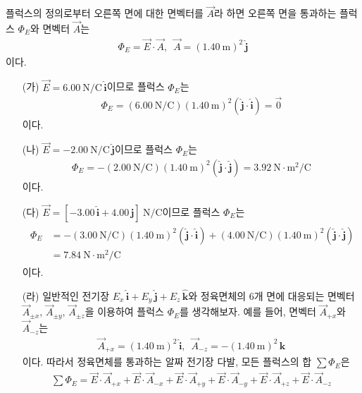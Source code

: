\documentclass[tightenlines,floatfix,nofootinbib,superscriptaddress,fleqn]{revtex4-2}
\begin{document}
플럭스의 정의로부터 오른쪽 면에 대한 면벡터를 $\vec{A}$라 하면 
오른쪽 면을 통과하는 플럭스 $\Phi_E$와 면벡터 $\vec{A}$는
\begin{align}
  \Phi_E = \vec{E}\cdot\vec{A},\,\,\,
  \vec{A}=(1.40~\mathrm{m})^2\,\hat{\bm{j}}
\end{align}
이다. 
\begin{itemize}
  \item[(가)]$\vec{E} =  6.00~\mathrm{N/C}\,\hat{\bm{i}}$이므로 플럭스 $\Phi_E$는
  \begin{align}
    \Phi_E =(6.00~\mathrm{N/C})(1.40~\mathrm{m})^2(\hat{\bm{j}}\cdot\hat{\bm{i}})
    =\vec{0}
  \end{align}
  이다.
  \item[(나)]$\vec{E} = -2.00~\mathrm{N/C}\,\hat{\bm{j}}$이므로 플럭스 $\Phi_E$는
  \begin{align}
    \Phi_E =-(2.00~\mathrm{N/C})(1.40~\mathrm{m})^2(\hat{\bm{j}}\cdot\hat{\bm{j}})
    =3.92~\mathrm{N\cdot m^2/C}
  \end{align}
  이다.
  \item[(다)]$\vec{E} = [-3.00\,\hat{\bm{i}}+4.00\,\hat{\bm{j}}]~\mathrm{N/C}$이므로 
  플럭스 $\Phi_E$는
  \begin{align}
    \begin{split}
      \Phi_E &=-(3.00~\mathrm{N/C})(1.40~\mathrm{m})^2(\hat{\bm{j}}\cdot\hat{\bm{i}})
      +(4.00~\mathrm{N/C})(1.40~\mathrm{m})^2(\hat{\bm{j}}\cdot\hat{\bm{j}})  \\
      &=7.84~\mathrm{N\cdot m^2/C}
    \end{split}
  \end{align}
  이다.
  \item[(라)] 일반적인 전기장 $E_x\,\hat{\bm{i}}+E_y\,\hat{\bm{j}}+E_z\,\hat{\bm{k}}$와
  정육면체의 6개 면에 대응되는 면벡터 $\vec{A}_{\pm x},\,\vec{A}_{\pm y},
  \,\vec{A}_{\pm z}$을 이용하여 플럭스 $\Phi_E$를 생각해보자. 예를 들어, 면벡터 
  $\vec{A}_{+x}$와 $\vec{A}_{-z}$는
  \begin{align}
    \vec{A}_{+x} =  (1.40~\mathrm{m})^2\,\hat{\bm{i}},\,\,\,
    \vec{A}_{-z} = -(1.40~\mathrm{m})^2\,\hat{\bm{k}}
  \end{align}
  이다. 따라서 정육면체를 통과하는 알짜 전기장 다발, 모든 플럭스의 합 $\sum\Phi_E$은
  \begin{align}
    \sum\Phi_E=\vec{E}\cdot\vec{A}_{+x}+\vec{E}\cdot\vec{A}_{-x}
    +\vec{E}\cdot\vec{A}_{+y}+\vec{E}\cdot\vec{A}_{-y}
    +\vec{E}\cdot\vec{A}_{+z}+\vec{E}\cdot\vec{A}_{-z}
  \end{align}

\end{itemize}
\end{document}
